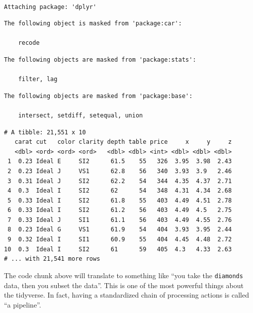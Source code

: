 \documentclass[
]{book}
\newenvironment{Shaded}{\begin{snugshade}}{\end{snugshade}}
\newcommand{\KeywordTok}[1]{\textcolor[rgb]{0.13,0.29,0.53}{\textbf{#1}}}
\newcommand{\NormalTok}[1]{#1}
\newcommand{\OperatorTok}[1]{\textcolor[rgb]{0.81,0.36,0.00}{\textbf{#1}}}
\newcommand{\StringTok}[1]{\textcolor[rgb]{0.31,0.60,0.02}{#1}}
\begin{document}
\begin{verbatim}

Attaching package: 'dplyr'
\end{verbatim}

\begin{verbatim}
The following object is masked from 'package:car':

    recode
\end{verbatim}

\begin{verbatim}
The following objects are masked from 'package:stats':

    filter, lag
\end{verbatim}

\begin{verbatim}
The following objects are masked from 'package:base':

    intersect, setdiff, setequal, union
\end{verbatim}

\begin{Shaded}
\end{Shaded}

\begin{verbatim}
# A tibble: 21,551 x 10
   carat cut   color clarity depth table price     x     y     z
   <dbl> <ord> <ord> <ord>   <dbl> <dbl> <int> <dbl> <dbl> <dbl>
 1  0.23 Ideal E     SI2      61.5    55   326  3.95  3.98  2.43
 2  0.23 Ideal J     VS1      62.8    56   340  3.93  3.9   2.46
 3  0.31 Ideal J     SI2      62.2    54   344  4.35  4.37  2.71
 4  0.3  Ideal I     SI2      62      54   348  4.31  4.34  2.68
 5  0.33 Ideal I     SI2      61.8    55   403  4.49  4.51  2.78
 6  0.33 Ideal I     SI2      61.2    56   403  4.49  4.5   2.75
 7  0.33 Ideal J     SI1      61.1    56   403  4.49  4.55  2.76
 8  0.23 Ideal G     VS1      61.9    54   404  3.93  3.95  2.44
 9  0.32 Ideal I     SI1      60.9    55   404  4.45  4.48  2.72
10  0.3  Ideal I     SI2      61      59   405  4.3   4.33  2.63
# ... with 21,541 more rows
\end{verbatim}

The code chunk above will translate to something like ``you take the \texttt{diamonds} data, then you subset the data''.
This is one of the most powerful things about the tidyverse. In fact, having a standardized chain of processing actions is called ``a pipeline''.
\end{document}
